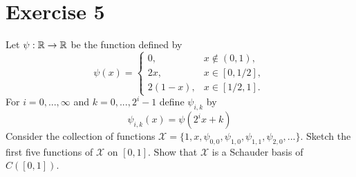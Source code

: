 \newcommand{\scX}{\mathcal{X}}

\newpage
\section{Exercise 5}
Let $\psi : \mathbb{R} \to \mathbb{R}$ be the function defined by 
\[\psi(x) = \begin{cases}
    0, &x \not \in (0, 1),\\
    2x, &x \in [0, 1/2],\\
    2(1 - x), &x \in [1/2, 1].
\end{cases}\]
For $i = 0, ..., \infty$ and $k = 0, ..., 2^i - 1$ define $\psi_{i, k}$ by 
\[\psi_{i, k}(x) = \psi(2^ix + k)\]
Consider the collection of functions $\scX = \{1, x, \psi_{0, 0}, \psi_{1, 0}, \psi_{1, 1}, \psi_{2, 0}, ...\}$. Sketch the first five functions of $\scX$ on $[0, 1]$. Show that $\scX$ is a Schauder basis of $C([0, 1])$. 
\partbreak
